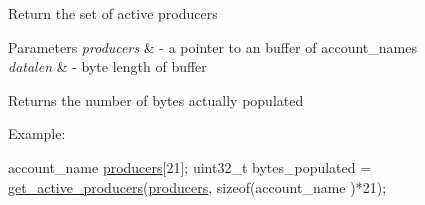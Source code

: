 Return the set of active producers 
\begin{DoxyParams}{Parameters}
{\em producers} & -\/ a pointer to an buffer of account\+\_\+names \\
\hline
{\em datalen} & -\/ byte length of buffer \\
\hline
\end{DoxyParams}
\begin{DoxyReturn}{Returns}
the number of bytes actually populated
\end{DoxyReturn}
Example\+: 
\begin{DoxyCode}
account\_name \mbox{\hyperlink{structproducers}{producers}}[21];
uint32\_t bytes\_populated = \mbox{\hyperlink{group__chaincapi_gad24c6348e365fca793e903acdfbb776c}{get\_active\_producers}}(\mbox{\hyperlink{structproducers}{producers}}, \textcolor{keyword}{sizeof}(account\_name
      )*21);
\end{DoxyCode}
 